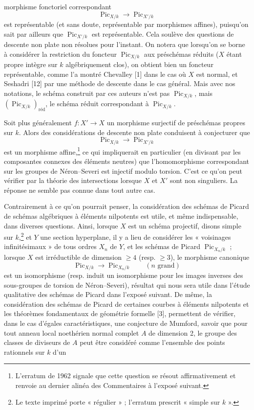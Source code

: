 morphisme fonctoriel correspondant
\[
\operatorname{Pic}_{X/k}\longrightarrow\operatorname{Pic}_{X'/k}
\]
est représentable (et sans doute, représentable par morphismes affines),
puisqu'on sait par ailleurs que $\operatorname{Pic}_{X'/k}$ est représentable.
Cela soulève des questions de descente non plate non résolues pour l'instant.
On notera que lorsqu'on se borne à considérer la restriction du foncteur
$\operatorname{Pic}_{X/k}$ aux préschémas réduits ($X$ étant propre intègre
sur $k$ algébriquement clos), on obtient bien un foncteur représentable, comme
l'a montré Chevalley [1] dans le cas où $X$ est normal, et Seshadri [12] par une
méthode de descente dans le cas général. Mais avec nos notations, le schéma
construit par ces auteurs n'est pas $\operatorname{Pic}_{X/k}$, mais
$(\operatorname{Pic}_{X/k})_{\mathrm{réd}}$, le schéma réduit correspondant à
$\operatorname{Pic}_{X/k}$.

 Soit plus généralement $f:X'\longrightarrow X$ un
morphisme surjectif de préschémas propres sur $k$. Alors des considérations de
descente non plate conduisent à conjecturer que
\[
\operatorname{Pic}_{X/k}\longrightarrow\operatorname{Pic}_{X'/k}
\]
est un morphisme affine,\footnote{L'erratum de 1962 signale que cette question
se résout affirmativement et renvoie au dernier alinéa des Commentaires à
l'exposé suivant.} ce qui impliquerait en particulier (en divisant par les
composantes connexes des éléments neutres) que l'homomorphisme correspondant
sur les groupes de Néron--Severi est injectif modulo torsion. C'est ce qu'on
peut vérifier par la théorie des intersections lorsque $X$ et $X'$ sont non
singuliers. La réponse ne semble pas connue dans tout autre cas.

 Contrairement à ce qu'on pourrait penser, la
considération des schémas de Picard de schémas algébriques à éléments
nilpotents est utile, et même indispensable, dans diverses questions. Ainsi,
lorsque $X$ est un schéma projectif, disons simple sur $k$,\footnote{Le texte
imprimé porte « régulier » ; l'erratum prescrit « simple sur $k$ ».} et $Y$ une
section hyperplane, il y a lieu de considérer les « voisinages
infinitésimaux » de tous ordres $X_n$ de $Y$, et les schémas de Picard
$\operatorname{Pic}_{X_n/k}$ ; lorsque $X$ est irréductible de dimension
$\geq4$ (resp. $\geq3$), le morphisme canonique
\[
\operatorname{Pic}_{X/k}\longrightarrow\operatorname{Pic}_{X_n/k}
\qquad(n\text{ grand})
\]
est un isomorphisme (resp. induit un isomorphisme pour les images inverses des
sous-groupes de torsion de Néron--Severi), résultat qui nous sera utile dans
l'étude qualitative des schémas de Picard dans l'exposé suivant. De même, la
considération des schémas de Picard de certaines courbes à éléments nilpotents
et les théorèmes fondamentaux de géométrie formelle [3], permettent de
vérifier, dans le cas d'égales caractéristiques, une conjecture de Mumford,
savoir que pour tout anneau local noethérien normal complet $A$ de dimension
2, le groupe des classes de diviseurs de $A$ peut être considéré comme
l'ensemble des points rationnels sur $k$ d'un

